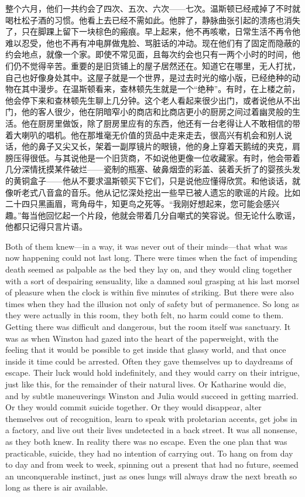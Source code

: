 \begin{paracol}{2}
整个六月，他们一共约会了四次、五次、六次——七次。温斯顿已经戒掉了不时就喝杜松子酒的习惯。他看上去已经不需如此。他胖了，静脉曲张引起的溃疡也消失了，只在脚踝上留下一块棕色的瘢痕。早上起来，他不再咳嗽，日常生活不再令他难以忍受，他也不再有冲电屏做鬼脸、骂脏话的冲动。现在他们有了固定而隐蔽的约会地点，就像一个家。即使不常见面，且每次约会也只有一两个小时的时间，他们仍不觉得辛苦。重要的是旧货铺上的屋子居然还在。知道它在哪里，无人打扰，自己也好像身处其中。这屋子就是一个世界，是过去时光的缩小版，已经绝种的动物在其中漫步。在温斯顿看来，查林顿先生就是一个``绝种''。有时，在上楼之前，他会停下来和查林顿先生聊上几分钟。这个老人看起来很少出门，或者说他从不出门，他的客人很少，他在阴暗窄小的商店和比商店更小的厨房之间过着幽灵般的生活。他在厨房里做饭，除了厨房里应有的东西，他还有一台老得让人不敢相信的带着大喇叭的唱机。他在那堆毫无价值的货品中走来走去，很高兴有机会和别人说话，他的鼻子又尖又长，架着一副厚镜片的眼镜，他的身上穿着天鹅绒的夹克，肩膀压得很低。与其说他是一个旧货商，不如说他更像一位收藏家。有时，他会带着几分深情抚摸某件破烂——瓷制的瓶塞、破鼻烟壶的彩盖、装着夭折了的婴孩头发的黄铜盒子——他从不要求温斯顿买下它们，只是说他应懂得欣赏。和他谈话，就像听老式八音盒的音乐。他从记忆深处挖出一些早已被人遗忘的歌谣的片段。比如二十四只黑画眉，弯角母牛，知更鸟之死等。``我刚好想起来，您可能会感兴趣。''每当他回忆起一个片段，他就会带着几分自嘲式的笑容说。但无论什么歌谣，他都只记得只言片语。

\switchcolumn*

Both of them knew---in a way, it was never out of their minds---that
what was now happening could not last long. There were times when the
fact of impending death seemed as palpable as the bed they lay on, and
they would cling together with a sort of despairing sensuality, like a
damned soul grasping at his last morsel of pleasure when the clock is
within five minutes of striking. But there were also times when they had
the illusion not only of safety but of permanence. So long as they were
actually in this room, they both felt, no harm could come to them.
Getting there was difficult and dangerous, but the room itself was
sanctuary. It was as when Winston had gazed into the heart of the
paperweight, with the feeling that it would be possible to get inside
that glassy world, and that once inside it time could be arrested. Often
they gave themselves up to daydreams of escape. Their luck would hold
indefinitely, and they would carry on their intrigue, just like this,
for the remainder of their natural lives. Or Katharine would die, and by
subtle maneuverings Winston and Julia would succeed in getting married.
Or they would commit suicide together. Or they would disappear, alter
themselves out of recognition, learn to speak with proletarian accents,
get jobs in a factory, and live out their lives undetected in a back
street. It was all nonsense, as they both knew. In reality there was no
escape. Even the one plan that was practicable, suicide, they had no
intention of carrying out. To hang on from day to day and from week to
week, spinning out a present that had no future, seemed an unconquerable
instinct, just as one\textquotesingle s lungs will always draw the next
breath so long as there is air available.


\end{paracol}
